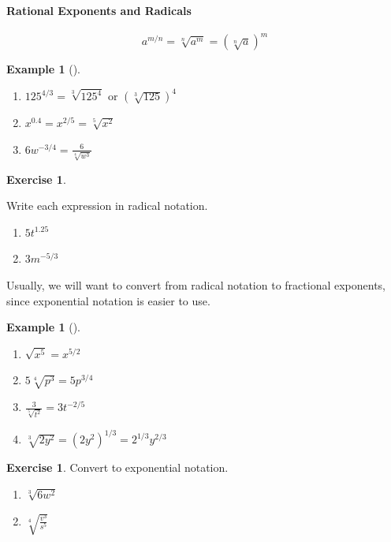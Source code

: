 \documentclass[10pt,]{book}
\theoremstyle{plain}
\theoremstyle{definition}
\theoremstyle{definition}
\theoremstyle{definition}
\newtheorem{example}[theorem]{Example}
\theoremstyle{definition}
\theoremstyle{definition}
\newtheorem{exercise}[theorem]{Exercise}
\numberwithin{equation}{section}
\begin{document}
\paragraph[Rational Exponents and Radicals]{Rational Exponents and Radicals}\label{paragraphs-52}
\begin{equation*}
        a^{m/n} = \sqrt[n]{a^m} =\left( \sqrt[n]{a}\right)^m
    \end{equation*}\begin{example}[]\label{example-rational-exponent-to-radicals}
\leavevmode%
\begin{enumerate}[label=*\alph**]
\item\hypertarget{li-535}{}\(125^{4/3} = \sqrt[3]{125^4} \text{ or } \left(\sqrt[3]{125}\right)^4\)\item\hypertarget{li-536}{}\(x^{0.4} = x^{2/5} = \sqrt[5]{x^2}\)\item\hypertarget{li-537}{}\(6w^{−3/4} = \frac{6}{\sqrt[4]{w^3}}\)\end{enumerate}
\end{example}
\begin{exercise}\label{exercise-rational-exponent-to-radical}

Write each expression in radical notation.
\leavevmode%
\begin{enumerate}[label=*\alph**]
\item\hypertarget{li-538}{}\(5t^{1.25}\)\item\hypertarget{li-539}{}\( 3m^{−5/3}\)\end{enumerate}
\end{exercise}
\par

    Usually, we will want to convert from radical notation to fractional exponents, since exponential notation is easier to use.
%
\begin{example}[]\label{example-radical-to-exponential}
\leavevmode%
\begin{enumerate}[label=*\alph**]
\item\hypertarget{li-540}{}\(\sqrt{x^5} = x^{5/2}\)\item\hypertarget{li-541}{}\( 5 \sqrt[4]{p^3} = 5p^{3/4}\)\item\hypertarget{li-542}{}\( \frac{3}{\sqrt[5]{t^2}}= 3t^{−2/5}\)\item\hypertarget{li-543}{}\( \sqrt[3]{2y^2} = \left(2y^2\right)^{1/3} = 2^{1/3} y^{2/3}\)\end{enumerate}
\end{example}
\begin{exercise}\label{exercise-radical-to-exponential}
    Convert to exponential notation.%
\leavevmode%
\begin{enumerate}[label=*\alph**]
\item\hypertarget{li-544}{}\(\sqrt[3]{6w^2}\)\item\hypertarget{li-545}{}\(  \sqrt[4]{\frac{v^3}{s^5}}\)\end{enumerate}
\end{exercise}
\typeout{************************************************}
\typeout{************************************************}
\end{document}
